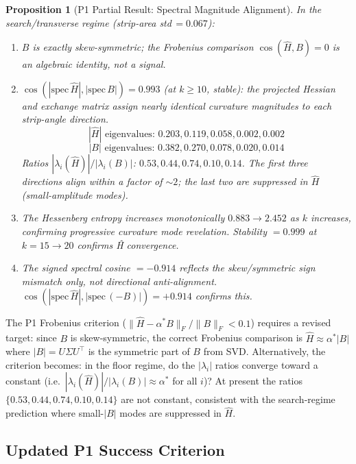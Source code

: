 \documentclass[11pt]{amsart}
\newtheorem{proposition}[theorem]{Proposition}
\begin{document}
\begin{proposition}[P1 Partial Result: Spectral Magnitude Alignment]
\label{prop:p1_partial}
In the search/transverse regime (strip-area std\,$=0.067$):
\begin{enumerate}
\item $B$ is exactly skew-symmetric; the Frobenius comparison
  $\cos(\hat{H}, B) = 0$ is an algebraic identity, not a signal.
\item $\cos(|\mathrm{spec}\,\hat{H}|, |\mathrm{spec}\,B|) = 0.993$
  (at $k \geq 10$, stable): the projected Hessian and exchange matrix
  assign nearly identical curvature magnitudes to each strip-angle
  direction.
  \[
    |\hat{H}|\text{ eigenvalues: } 0.203, 0.119, 0.058, 0.002, 0.002
  \]
  \[
    |B|\text{ eigenvalues: } 0.382, 0.270, 0.078, 0.020, 0.014
  \]
  Ratios $|\lambda_i(\hat{H})|/|\lambda_i(B)|$: $0.53, 0.44, 0.74, 0.10, 0.14$.
  The first three directions align within a factor of $\sim 2$;
  the last two are suppressed in $\hat{H}$ (small-amplitude modes).
\item The Hessenberg entropy increases monotonically $0.883 \to 2.452$
  as $k$ increases, confirming progressive curvature mode revelation.
  Stability $= 0.999$ at $k=15\to20$ confirms Ĥ convergence.
\item The signed spectral cosine $= -0.914$ reflects the
  skew/symmetric sign mismatch only, not directional anti-alignment.
  $\cos(|\mathrm{spec}\,\hat{H}|, |\mathrm{spec}\,(-B)|) = +0.914$
  confirms this.
\end{enumerate}
\end{proposition}

The P1 Frobenius criterion ($\|\hat{H} - \alpha^* B\|_F / \|B\|_F < 0.1$)
requires a revised target: since $B$ is skew-symmetric, the correct
Frobenius comparison is $\hat{H} \approx \alpha^* |B|$ where
$|B| = U\Sigma U^\top$ is the symmetric part of $B$ from SVD.
Alternatively, the criterion becomes: in the floor regime, do the
$|\lambda_i|$ ratios converge toward a constant (i.e.\
$|\lambda_i(\hat{H})| / |\lambda_i(B)| \approx \alpha^*$ for all $i$)?
At present the ratios $\{0.53, 0.44, 0.74, 0.10, 0.14\}$ are not
constant, consistent with the search-regime prediction where small-$|B|$
modes are suppressed in $\hat{H}$.

\subsection{Updated P1 Success Criterion}
\end{document}
